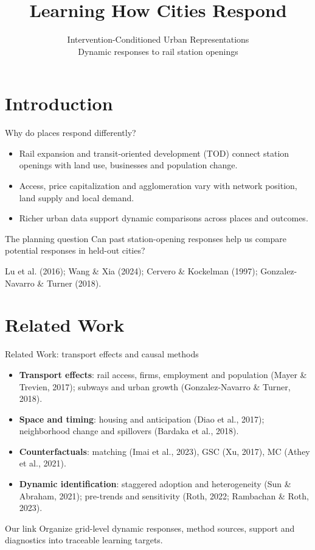 \documentclass[aspectratio=169,11pt]{beamer}
\title[Learning How Cities Respond]{Learning How Cities Respond}
\subtitle{Intervention-Conditioned Urban Representations\\[.6em]\small Dynamic responses to rail station openings}
\author{}\institute{}\date{}
\newcommand{\key}[1]{\textbf{\color{blue!55!black}#1}}
\begin{document}
\section{Introduction}
\begin{frame}[plain]\titlepage\end{frame}

\begin{frame}{Why do places respond differently?}
\small
\begin{itemize}
 \item Rail expansion and transit-oriented development (TOD) connect station openings with land use, businesses and population change.
 \item Access, price capitalization and agglomeration vary with network position, land supply and local demand.
 \item Richer urban data support dynamic comparisons across places and outcomes.
\end{itemize}
\begin{block}{The planning question}
Can past station-opening responses help us compare potential responses in held-out cities?
\end{block}
\footnotesize Lu et al. (2016); Wang \& Xia (2024); Cervero \& Kockelman (1997);
Gonzalez-Navarro \& Turner (2018).
\end{frame}

\section{Related Work}

\begin{frame}{Related Work: transport effects and causal methods}
\small
\begin{itemize}
 \item \key{Transport effects}: rail access, firms, employment and population (Mayer \& Trevien, 2017); subways and urban growth (Gonzalez-Navarro \& Turner, 2018).
 \item \key{Space and timing}: housing and anticipation (Diao et al., 2017); neighborhood change and spillovers (Bardaka et al., 2018).
 \item \key{Counterfactuals}: matching (Imai et al., 2023), GSC (Xu, 2017), MC (Athey et al., 2021).
 \item \key{Dynamic identification}: staggered adoption and heterogeneity (Sun \& Abraham, 2021); pre-trends and sensitivity (Roth, 2022; Rambachan \& Roth, 2023).
\end{itemize}
\begin{block}{Our link}
Organize grid-level dynamic responses, method sources, support and diagnostics into traceable learning targets.
\end{block}
\end{frame}
\end{document}
